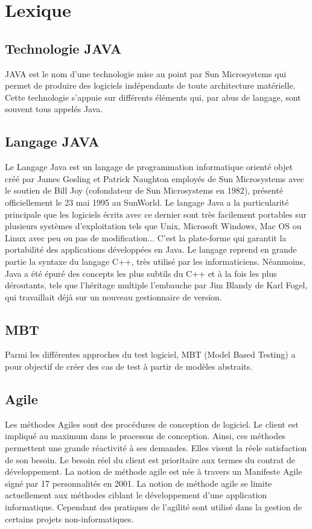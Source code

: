 \chapter{Lexique}

\section{Technologie JAVA}\label{lexique:JAVA_tech}
JAVA est le nom d'une technologie mise au point par Sun Microsystems qui permet de produire des logiciels indépendants de toute architecture matérielle. Cette technologie s'appuie sur différents éléments qui, par abus de langage, sont souvent tous appelés Java.

\section{Langage JAVA}\label{lexique:JAVA_lg}
Le Langage Java est un langage de programmation informatique orienté objet créé par James Gosling et Patrick Naughton employés de Sun Microsystems avec le soutien de Bill Joy (cofondateur de Sun Microsystems en 1982), présenté officiellement le 23 mai 1995 au SunWorld. Le langage Java a la particularité principale que les logiciels écrits avec ce dernier sont très facilement portables sur plusieurs systèmes d'exploitation tels que Unix, Microsoft Windows, Mac OS ou Linux avec peu ou pas de modification... C'est la plate-forme qui garantit la portabilité des applications développées en Java. Le langage reprend en grande partie la syntaxe du langage C++, très utilisé par les informaticiens. Néanmoins, Java a été épuré des concepts les plus subtils du C++ et à la fois les plus déroutants, tels que l'héritage multiple 	 l'embauche par Jim Blandy de Karl Fogel, qui travaillait déjà sur un nouveau gestionnaire de version. 

\section{MBT}\label{lexique:MBT}
Parmi les différentes approches du test logiciel, MBT (Model Based Testing) a pour objectif de créer des cas de test à partir de modèles abstraits.

\section{Agile}\label{lexique:agile}
Les méthodes Agiles sont des procédures de conception de logiciel. Le client est impliqué au maximum dans le processus de conception. Ainsi, ces méthodes permettent une grande réactivité à ses demandes. Elles visent la réele satisfaction de son besoin. Le besoin réel du client est prioritaire aux termes du contrat de développement. La notion de méthode agile est née à travers un Manifeste Agile signé par 17 personnalités en 2001. La notion de méthode agile se limite actuellement aux méthodes ciblant le développement d'une application informatique. Cependant des pratiques de l'agilité sont utilisé dans la gestion de certains projets non-informatiques.

